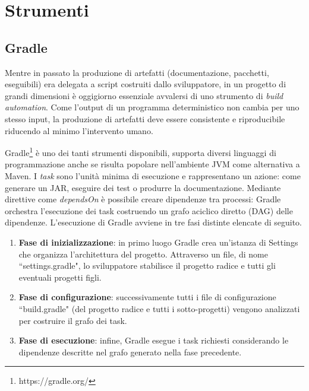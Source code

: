 \section{Strumenti}

\subsection{Gradle}

Mentre in passato la produzione di artefatti (documentazione, pacchetti, eseguibili) era delegata a script costruiti dallo sviluppatore, in un progetto di grandi dimensioni è oggigiorno essenziale avvalersi di uno strumento di \textit{build automation}. Come l'output di un programma deterministico non cambia per uno stesso input, la produzione di artefatti deve essere consistente e riproducibile riducendo al minimo l'intervento umano. 

Gradle\footnote{https://gradle.org/} è uno dei tanti strumenti disponibili, supporta diversi linguaggi di programmazione anche se risulta popolare nell'ambiente JVM come alternativa a Maven. I \textit{task} sono l'unità minima di esecuzione e rappresentano un azione: come generare un JAR, eseguire dei test o produrre la documentazione. Mediante direttive come \textit{dependsOn} è possibile creare dipendenze tra processi: Gradle orchestra l'esecuzione dei task costruendo un grafo aciclico diretto (DAG) delle dipendenze. L'esecuzione di Gradle avviene in tre fasi distinte elencate di seguito.
\begin{enumerate}
	\item \textbf{Fase di inizializzazione}: in primo luogo Gradle crea un'istanza di Settings che organizza l'architettura del progetto. Attraverso un file, di nome ``settings.gradle", lo sviluppatore stabilisce il progetto radice e tutti gli eventuali progetti figli. 
	\item \textbf{Fase di configurazione}: successivamente tutti i file di configurazione ``build\-.\-gradle" (del progetto radice e tutti i sotto-progetti) vengono analizzati per costruire il grafo dei task.
	\item \textbf{Fase di esecuzione}: infine, Gradle esegue i task richiesti considerando le dipendenze descritte nel grafo generato nella fase precedente.
\end{enumerate}


